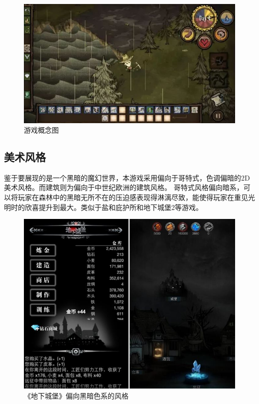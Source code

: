 \documentclass[UTF8,AutoFakeBold=1,AutoFakeSlant,zihao=-4]{cucthesis}
\begin{document}
\begin{figure}[ht]
    \centering
    \includegraphics[scale=0.5]{imgs/游戏概念图.jpg}    
    \caption{游戏概念图}
\end{figure}

\subsection{美术风格}
鉴于要展现的是一个黑暗的魔幻世界，本游戏采用偏向于哥特式，色调偏暗的2D美术风格。而建筑则为偏向于中世纪欧洲的建筑风格。
哥特式风格偏向暗系，可以将玩家在森林中的黑暗无所不在的压迫感表现得淋漓尽致，能使得玩家在重见光明时的欣喜提升到最大。类似于盐和庇护所和地下城堡2等游戏。

\begin{figure}[ht]
    \centering
    \includegraphics[scale=0.8]{imgs/美术风格01.png}    
    \caption{《地下城堡》偏向黑暗色系的风格}
\end{figure}
\end{document}
